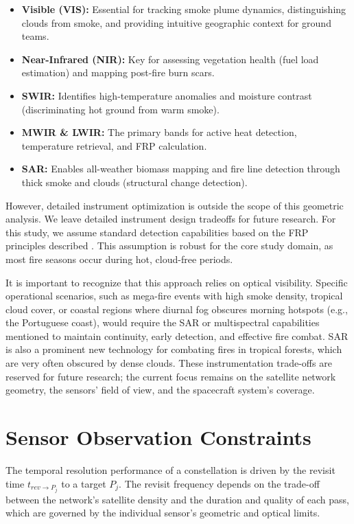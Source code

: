 \begin{itemize}
    \item \textbf{Visible (VIS):} Essential for tracking smoke plume dynamics, distinguishing clouds from smoke, and providing intuitive geographic context for ground teams.
    \item \textbf{Near-Infrared (NIR):} Key for assessing vegetation health (fuel load estimation) and mapping post-fire burn scars.
    \item \textbf{SWIR:} Identifies high-temperature anomalies and moisture contrast (discriminating hot ground from warm smoke).
    \item \textbf{MWIR \& LWIR:} The primary bands for active heat detection, temperature retrieval, and FRP calculation.
    \item \textbf{SAR:} Enables all-weather biomass mapping and fire line detection through thick smoke and clouds (structural change detection).
\end{itemize}

However, detailed instrument optimization is outside the scope of this geometric analysis. We leave detailed instrument design tradeoffs for future research. For this study, we assume standard detection capabilities based on the FRP principles described  . This assumption is robust for the core study domain, as most fire seasons occur during hot, cloud-free periods.

It is important to recognize that this approach relies on optical visibility. Specific operational scenarios, such as mega-fire events with high smoke density, tropical cloud cover, or coastal regions where diurnal fog obscures morning hotspots (e.g., the Portuguese coast), would require the SAR or multispectral capabilities mentioned to maintain continuity, early detection, and effective fire combat. SAR is also a prominent new technology for combating fires in tropical forests, which are very often obscured by dense clouds. These instrumentation trade-offs are reserved for future research; the current focus remains on the satellite network geometry, the sensors' field of view, and the spacecraft system's coverage.

\section{Sensor Observation Constraints}
\label{sec:sensor_observation_constraints}

The temporal resolution performance of a constellation is driven by the revisit time $t_{rev \to P_j}$ to a target $P_j$. The revisit frequency depends on the trade-off between the network's satellite density and the duration and quality of each pass, which are governed by the individual sensor's geometric and optical limits.

